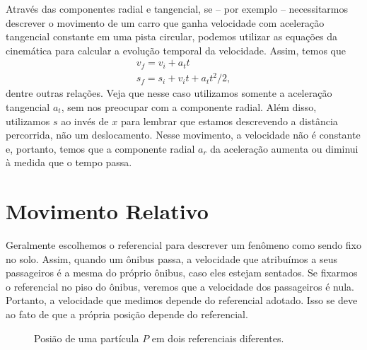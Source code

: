 Através das componentes radial e tangencial, se -- por exemplo -- necessitarmos descrever o movimento de um carro que ganha velocidade com aceleração tangencial constante em uma pista circular, podemos utilizar as equações da cinemática para calcular a evolução temporal da velocidade. Assim, temos que
\begin{align}
  v_f = v_i + a_t t \\
  s_f = s_i + v_i t + a_t t^2/2,
\end{align}
%
dentre outras relações. Veja que nesse caso utilizamos somente a aceleração tangencial $a_t$, sem nos preocupar com a componente radial. Além disso, utilizamos $s$ ao invés de $x$ para lembrar que estamos descrevendo a distância percorrida, não um deslocamento. Nesse movimento, a velocidade não é constante e, portanto, temos que a componente radial $a_r$ da aceleração aumenta ou diminui à medida que o tempo passa.

\section{Movimento Relativo}

Geralmente escolhemos o referencial para descrever um fenômeno como sendo fixo no solo. Assim, quando um ônibus passa, a velocidade que atribuímos a seus passageiros é a mesma do próprio ônibus, caso eles estejam sentados. Se fixarmos o referencial no piso do ônibus, veremos que a velocidade dos passageiros é nula. Portanto, a velocidade que medimos depende do referencial adotado. Isso se deve ao fato de que a própria posição depende do referencial.

\begin{figure}[!h]
\centering
{}
\caption{Posião de uma partícula $P$ em dois referenciais diferentes. \label{Fig:Ref_mov_relativo}}
\end{figure}

